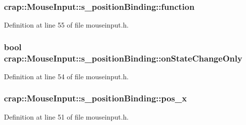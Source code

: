 \subsubsection[{function}]{ crap\+::\+Mouse\+Input\+::s\+\_\+position\+Binding\+::function}\label{structcrap_1_1_mouse_input_1_1s__position_binding_a31d531f0fd0ecfaf9c1d841632cf7deb}


Definition at line 55 of file mouseinput.\+h.

\hypertarget{structcrap_1_1_mouse_input_1_1s__position_binding_adc14f5541941e3a2e6168b5cdb6f2c01}{}
\subsubsection[{on\+State\+Change\+Only}]{\setlength{\rightskip}{0pt plus 5cm}bool crap\+::\+Mouse\+Input\+::s\+\_\+position\+Binding\+::on\+State\+Change\+Only}\label{structcrap_1_1_mouse_input_1_1s__position_binding_adc14f5541941e3a2e6168b5cdb6f2c01}


Definition at line 54 of file mouseinput.\+h.

\hypertarget{structcrap_1_1_mouse_input_1_1s__position_binding_af1f25bdf38525cebee5041bbfbdb1239}{}
\subsubsection[{pos\+\_\+x}]{ crap\+::\+Mouse\+Input\+::s\+\_\+position\+Binding\+::pos\+\_\+x}\label{structcrap_1_1_mouse_input_1_1s__position_binding_af1f25bdf38525cebee5041bbfbdb1239}


Definition at line 51 of file mouseinput.\+h.

\hypertarget{structcrap_1_1_mouse_input_1_1s__position_binding_ad05b14a8fcc7b2e2f15923888b2683a2}{}
